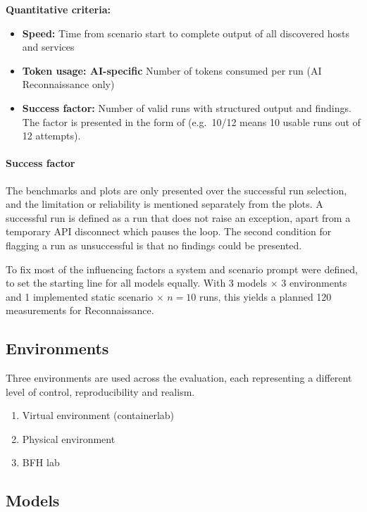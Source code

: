 \textbf{Quantitative criteria:}

\begin{itemize}
    \item \textbf{Speed:} Time from scenario start to complete output of all discovered hosts and services
    \item \textbf{Token usage: AI-specific} Number of tokens consumed per run (\gls{AI} Reconnaissance only)
    \item \textbf{Success factor:} Number of valid runs with structured output and findings.
    The factor is presented in the form of (e.g.\ 10/12 means 10 usable runs out of 12 attempts).
\end{itemize}

\paragraph{Success factor}\label{par:success-factor}
The benchmarks and plots are only presented over the successful run selection, and the limitation or reliability is mentioned separately from the plots.
A successful run is defined as a run that does not raise an exception, apart from a temporary \gls{API} disconnect which pauses the loop.
The second condition for flagging a run as unsuccessful is that no findings could be presented.

To fix most of the influencing factors a system and scenario prompt were defined,
to set the starting line for all models equally.
With 3 models $\times$ 3 environments and 1 implemented static scenario $\times$ $n = 10$ runs, this yields a planned 120 measurements for Reconnaissance.

\subsection{Environments}\label{subsec:environments}

Three environments are used across the evaluation, each representing a different level of control, reproducibility and realism.

\begin{enumerate}
    \item Virtual environment (containerlab)
    \item Physical environment
    \item BFH lab
\end{enumerate}

\subsection{Models}\label{subsec:models}


